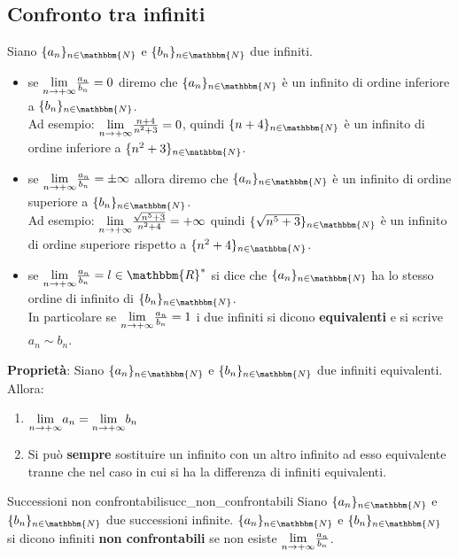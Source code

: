 \documentclass[12pt]{report}
\newcounter{definition}
\newcommand{\nmu}{}
\begin{document}
	\subsection{Confronto tra infiniti}
	Siano $\{a_n\}_{n \in \mathbbm{N}}$ e $\{b_n\}_{n \in \mathbbm{N}}$ due infiniti.
	\begin{itemize}
		\item se $\mathlarger{\lim_{n \to +\infty}}\frac{a_n}{b_n} = 0$ diremo che $\{a_n\}_{n\in\mathbbm{N}}$ è un infinito di ordine inferiore a $\{b_n\}_{n\in\mathbbm{N}}$. \\
		Ad esempio: $\mathlarger{\lim_{n \to +\infty}}\frac{n+4}{n^2+3} = 0$, quindi $\{n + 4\}_{n \in \mathbbm{N}}$ è un infinito di ordine inferiore a $\{n^2+3\}_{n \in \mathbbm{N}}$.
		\item se $\mathlarger{\lim_{n \to +\infty}}\frac{a_n}{b_n} = \pm\infty$ allora diremo che $\{a_n\}_{n \in \mathbbm{N}}$ è un infinito di ordine superiore a $\{b_n\}_{n \in \mathbbm{N}}$. \\
		Ad esempio: $\mathlarger{\lim_{n \to +\infty}}\frac{
			\sqrt{n^5 + 3}}{n^2 + 4} = +\infty$ quindi $\{\sqrt{n^5 + 3}\}_{n \in \mathbbm{N}}$ è un infinito di ordine superiore rispetto a $\{n^2 + 4\}_{n \in \mathbbm{N}}$.
		\item se $\mathlarger{\lim_{n \to +\infty}}\frac{a_n}{b_n}=l \in \mathbbm{R}^*$ si dice che $\{a_n\}_{n \in \mathbbm{N}}$ ha lo stesso ordine di infinito di $\{b_n\}_{n \in \mathbbm{N}}$. \\
		In particolare se $\mathlarger{\lim_{n \to +\infty}}\frac{a_n}{b_n}=1$ i due infiniti si dicono \textbf{equivalenti} e si scrive $a_n \sim b_n$.
	\end{itemize}
	\textbf{Proprietà}: Siano $\{a_n\}_{n \in \mathbbm{N}}$ e $\{b_n\}_{n\in\mathbbm{N}}$ due infiniti equivalenti. Allora:
	\begin{enumerate}
		\item $\mathlarger{\lim_{n \to +\infty}}a_n=\mathlarger{\lim_{n \to +\infty}}b_n$
		\item Si può \textbf{sempre} sostituire un infinito con un altro infinito ad esso equivalente tranne che nel caso in cui si ha la differenza di infiniti equivalenti. \\
	\end{enumerate}
	\begin{definition}{\nmu Successioni non confrontabili}{succ_non_confrontabili}
		Siano $\{a_n\}_{n \in \mathbbm{N}}$ e $\{b_n\}_{n \in \mathbbm{N}}$ due successioni infinite. $\{a_n\}_{n\in\mathbbm{N}}$ e $\{b_n\}_{n\in\mathbbm{N}}$ si dicono infiniti \textbf{non confrontabili} se non esiste $\mathlarger{\lim_{n \to +\infty}}\frac{a_n}{b_n}$.
	\end{definition}
\end{document}
